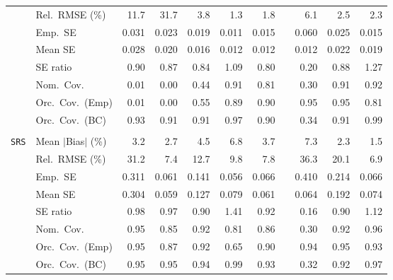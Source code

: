 \begin{landscape}
\begin{longtable}{llrrrrrrrrr}
 & Rel.\ RMSE (\%) & 11.7 & 31.7 & 3.8 & \cellcolor{rankone}1.3 & \cellcolor{ranktwo}1.8 &  & 6.1 & 2.5 & \cellcolor{rankthree}2.3 \\
 & Emp.\ SE & 0.031 & 0.023 & 0.019 & 0.011 & 0.015 &  & 0.060 & 0.025 & 0.015 \\
 & Mean SE & 0.028 & 0.020 & 0.016 & 0.012 & 0.012 &  & 0.012 & 0.022 & 0.019 \\
 & SE ratio & \cellcolor{ranktwo}0.90 & 0.87 & 0.84 & \cellcolor{rankone}1.09 & 0.80 &  & 0.20 & \cellcolor{rankthree}0.88 & 1.27 \\
 & Nom.\ Cov. & 0.01 & 0.00 & 0.44 & \cellcolor{ranktwo}0.91 & \cellcolor{rankthree}0.81 &  & 0.30 & \cellcolor{ranktwo}0.91 & \cellcolor{rankone}0.92 \\
 & Orc.\ Cov.\ (Emp) & 0.01 & 0.00 & 0.55 & \cellcolor{rankthree}0.89 & \cellcolor{ranktwo}0.90 &  & \cellcolor{rankone}0.95 & \cellcolor{rankone}0.95 & 0.81 \\
 & Orc.\ Cov.\ (BC) & \cellcolor{rankone}0.93 & \cellcolor{ranktwo}0.91 & \cellcolor{ranktwo}0.91 & \cellcolor{rankone}0.97 & \cellcolor{rankthree}0.90 &  & 0.34 & \cellcolor{ranktwo}0.91 & \cellcolor{ranktwo}0.99 \\
\addlinespace[2pt]
\multicolumn{11}{l}{\textbf{Binary \& Categorical Phase-One Covariates}} \\
\addlinespace[2pt]
\quad \texttt{SRS} & Mean $|$Bias$|$ (\%) & 3.2 & \cellcolor{rankthree}2.7 & 4.5 & 6.8 & 3.7 &  & 7.3 & \cellcolor{ranktwo}2.3 & \cellcolor{rankone}1.5 \\
 & Rel.\ RMSE (\%) & 31.2 & \cellcolor{ranktwo}7.4 & 12.7 & 9.8 & \cellcolor{rankthree}7.8 &  & 36.3 & 20.1 & \cellcolor{rankone}6.9 \\
 & Emp.\ SE & 0.311 & 0.061 & 0.141 & 0.056 & 0.066 &  & 0.410 & 0.214 & 0.066 \\
 & Mean SE & 0.304 & 0.059 & 0.127 & 0.079 & 0.061 &  & 0.064 & 0.192 & 0.074 \\
 & SE ratio & \cellcolor{rankone}0.98 & \cellcolor{ranktwo}0.97 & 0.90 & 1.41 & \cellcolor{rankthree}0.92 &  & 0.16 & 0.90 & 1.12 \\
 & Nom.\ Cov. & \cellcolor{rankone}0.95 & 0.85 & \cellcolor{rankthree}0.92 & 0.81 & 0.86 &  & 0.30 & \cellcolor{rankthree}0.92 & \cellcolor{ranktwo}0.96 \\
 & Orc.\ Cov.\ (Emp) & \cellcolor{rankone}0.95 & 0.87 & 0.92 & 0.65 & 0.90 &  & \cellcolor{ranktwo}0.94 & \cellcolor{rankone}0.95 & \cellcolor{rankthree}0.93 \\
 & Orc.\ Cov.\ (BC) & \cellcolor{rankone}0.95 & \cellcolor{rankone}0.95 & \cellcolor{ranktwo}0.94 & 0.99 & \cellcolor{rankthree}0.93 &  & 0.32 & 0.92 & \cellcolor{rankthree}0.97 \\

\end{longtable}
\end{landscape}

